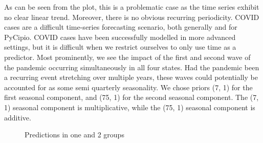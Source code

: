 \documentclass{article}
\begin{document}
As can be seen from the plot, this is a problematic case as the time series exhibit no clear linear trend. Moreover, there is no obvious recurring periodicity. COVID cases are a difficult time-series forecasting scenario, both generally and for PyCipio. COVID cases have been successfully modelled in more advanced settings, but it is difficult when we restrict ourselves to only use time as a predictor. Most prominently, we see the impact of the first and second wave of the pandemic occurring simultaneously in all four states. Had the pandemic been a recurring event stretching over multiple years, these waves could potentially be accounted for as some semi quarterly seasonality. We chose priors (7, 1) for the first seasonal component, and (75, 1) for the second seasonal component. The (7, 1) seasonal component is multiplicative, while the (75, 1) seasonal component is additive. 

\begin{figure}[H]
    \centering
    \quad
    \caption{Predictions in one and 2 groups}
\end{figure}
\end{document}
